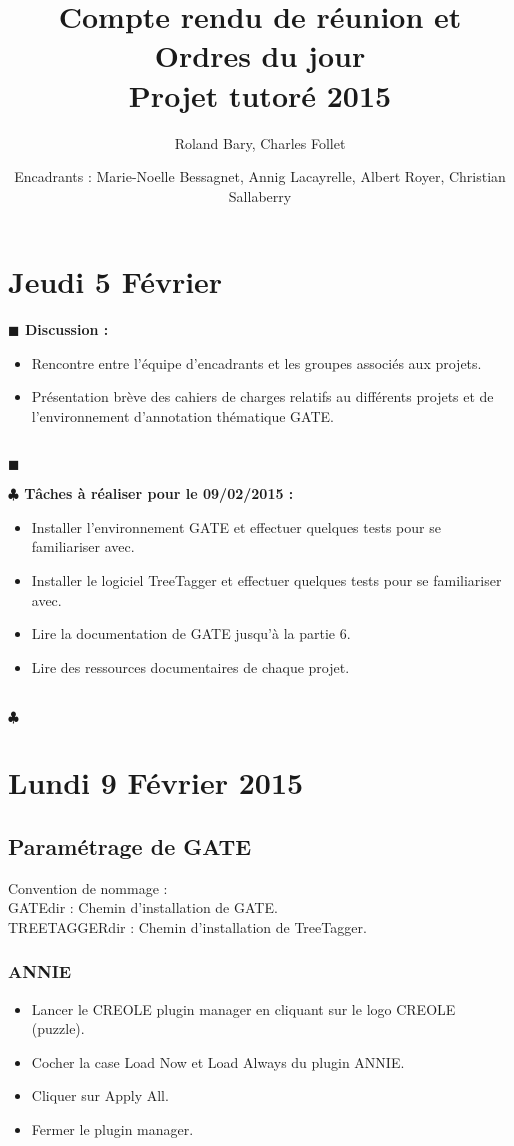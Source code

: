 \documentclass[a4paper, 10pt]{report}
\newenvironment{discussion}
    {
    \noindent\textbf{\textcolor{vert-1}{$\blacksquare$  Discussion : \\}}
    }
    {
    \noindent\textcolor{vert-1}{\\$\blacksquare$}\\
    }
\newenvironment{tache}[1][]
    {
    \noindent\textbf{\textcolor{vert-0}{$\clubsuit$  Tâches à réaliser pour le #1 : }}
    }
    {
    \noindent\textcolor{vert-0}{\\$\clubsuit$}\\
    }
\begin{document}
\title{{\huge \textbf{Compte rendu de réunion et Ordres du jour \\ Projet tutoré 2015}}}
\author{Roland Bary, Charles Follet}
\date{Encadrants : Marie-Noelle Bessagnet, Annig Lacayrelle,  Albert Royer, Christian Sallaberry}
\maketitle
\tableofcontents
\newpage

\section{Jeudi 5 Février}
\begin{discussion}
\begin{itemize}
\item Rencontre entre l'équipe d'encadrants et les groupes associés aux projets.
\item Présentation brève des cahiers de charges relatifs au différents projets et de l'environnement d'annotation thématique GATE.
\end{itemize}
\end{discussion}

\begin{tache}[09/02/2015]
\begin{itemize}
\item Installer l'environnement GATE et effectuer quelques tests pour se familiariser avec.
\item Installer  le logiciel TreeTagger et effectuer quelques tests pour se familiariser avec.
\item Lire la documentation de GATE jusqu'à la partie 6.
\item Lire des ressources documentaires de chaque projet.
\end{itemize}
\end{tache} 

\section{Lundi 9 Février 2015}
\subsection{Paramétrage de GATE}
Convention de nommage :\\
GATEdir : Chemin d'installation de GATE.\\
TREETAGGERdir : Chemin d'installation de TreeTagger.
\subsubsection{ANNIE}
\begin{itemize}
\item Lancer le CREOLE plugin manager en cliquant sur le logo CREOLE (puzzle).
\item Cocher la case Load Now et Load Always du plugin ANNIE.
\item Cliquer sur Apply All.
\item Fermer le plugin manager.
\end{itemize}
\end{document}
